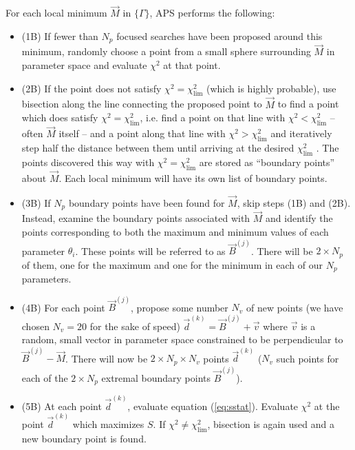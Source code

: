 \documentclass[useAMS,usenatbib]{aastex}
\begin{document}
For each local minimum $\vec{M}$ in $\{\Gamma\}$, APS performs the following:
\begin{itemize}
\item (1B) If fewer than $N_p$ focused searches have been proposed around this minimum, randomly
choose a point from a small sphere surrounding $\vec{M}$ in parameter space and 
evaluate $\chi^2$ at that point.  
\\
\item(2B) If the point does not satisfy $\chi^2=\chi^2_\text{lim}$ (which is highly probable), 
use bisection
along the line connecting the proposed point to $\vec{M}$ to find a point which does
satisfy $\chi^2=\chi^2_\text{lim}$, i.e. find a point on that line with
$\chi^2<\chi^2_\text{lim}$ -- often $\vec{M}$ itself -- and a point along that line
with $\chi^2>\chi^2_\text{lim}$ and iteratively step half the distance between them until
arriving at the desired $\chi^2_\text{lim}$ \cite{minuit}.  The points discovered this way with
$\chi^2=\chi^2_\text{lim}$ are stored as ``boundary points'' about $\vec{M}$.  Each local
minimum will have its own list of boundary points.
\\
\item(3B) If $N_p$ boundary points have been found for $\vec{M}$, skip steps (1B) and (2B).
Instead, examine the boundary points associated with $\vec{M}$ and identify the points
corresponding to both the maximum and minimum values of each parameter $\theta_i$.  These
points will be referred to as $\vec{B}^{(j)}$.  There will be $2\times N_p$ of them, one for
the maximum and one for the minimum in each of our $N_p$ parameters.  
\\
\item(4B) For each point
$\vec{B}^{(j)}$, propose some number $N_v$ of new points (we have chosen
$N_v=20$ for the sake of speed) $\vec{d}^{(k)} = \vec{B}^{(j)}+\vec{v}$ where $\vec{v}$ is a
random, small vector in parameter space constrained to be perpendicular to
$\vec{B}^{(j)}-\vec{M}$.  There will now be $2\times N_p \times N_v$ points $\vec{d}^{(k)}$
($N_v$ such points for each of the $2\times N_p$ extremal boundary points $\vec{B}^{(j)}$).
\\
\item(5B) At each point $\vec{d}^{(k)}$, evaluate equation (\ref{eq:sstat}).  Evaluate $\chi^2$
at the point $\vec{d}^{(k)}$ which maximizes $S$. If
$\chi^2 \neq \chi^2_\text{lim}$, bisection is again used and a new boundary point is found.
\end{itemize}
\end{document}
